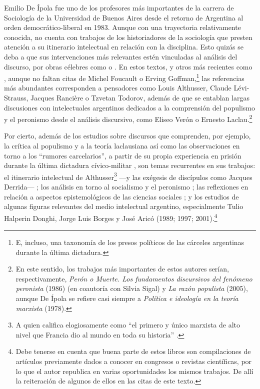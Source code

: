 Emilio De Ípola fue uno de los profesores más importantes de la carrera de Sociología de la Universidad de Buenos Aires desde el retorno de Argentina al orden democrático-liberal en 1983. Aunque con una trayectoria relativamente conocida, no cuenta con trabajos de los historiadores de la sociología que presten atención a su itinerario intelectual en relación con la disciplina. Esto quizás se deba a que sus intervenciones más relevantes estén vinculadas al análisis del discurso, por obras célebres como  o . En estos textos, y otros más recientes como , aunque no faltan citas de Michel Foucault o Erving Goffman,\footnote{E, incluso, una taxonomía de los presos políticos de las cárceles argentinas durante la última dictadura.} las referencias más abundantes corresponden a pensadores como Louis Althusser, Claude Lévi-Strauss, Jacques Rancière o Tzvetan Todorov, además de que se entablan largas discusiones con intelectuales argentinos dedicados a la comprensión del populismo y el peronismo desde el análisis discursivo, como Eliseo Verón o Ernesto Laclau.\footnote{En este sentido, los trabajos más importantes de estos autores serían, respectivamente, \emph{Perón o Muerte. Los fundamentos discursivos del fenómeno peronista} (1986) (en coautoría con Silvia Sigal) y \emph{La razón populista} (2005), aunque De Ípola se refiere casi siempre a \emph{Política e ideología en la teoría marxista} (1978).}

Por cierto, además de los estudios sobre discursos \parencite{1586-DEIPOLA1982,1587-DEIPOLA1987,1588-DEIPOLA1989,1589-DEIPOLA2021,1590-DEIPOLA1982} que comprenden, por ejemplo, la crítica al populismo y a la teoría laclausiana \parencite{1539-PORTANTIERO1988,1586-DEIPOLA1982,1587-DEIPOLA1987,1588-DEIPOLA1989,1591-DEIPOLA2008} así como las observaciones en torno a los \enquote{rumores carcelarios}, a partir de su propia experiencia en prisión durante la última dictadura cívico-militar \parencite{1586-DEIPOLA1982,1592-DEIPOLA1997,1593-DEIPOLA2005,1589-DEIPOLA2021}, son temas recurrentes en sus trabajos: el itinerario intelectual de Althusser\footnote{A quien califica elogiosamente como \enquote{el primero y único marxista de alto nivel que Francia dio al mundo en toda su historia} \parencite[125]{1607-DEIPOLA2011}.} ---y las exégesis de discípulos como Jacques Derrida--- \parencite{1594-DEIPOLA1974,1595-DEIPOLA2007,1607-DEIPOLA2011}; los análisis en torno al socialismo y el peronismo \parencite{1586-DEIPOLA1982,1596-DEIPOLA1987,1588-DEIPOLA1989,1597-DEIPOLA1990}; las reflexiones en relación a aspectos epistemológicos de las ciencias sociales \parencite{1556-CASTELLS1975,1557-CASTELLS1973,1598-DEIPOLA1969}; y los estudios de algunas figuras relevantes del medio intelectual argentino, especialmente Tulio Halperin Donghi, Jorge Luis Borges y José Aricó (1989; 1997; 2001).\footnote{Debe tenerse en cuenta que buena parte de estos libros son compilaciones de artículos previamente dados a conocer en congresos o revistas científicas, por lo que el autor republica en varias oportunidades los mismos trabajos. De allí la reiteración de algunos de ellos en las citas de este texto.}

